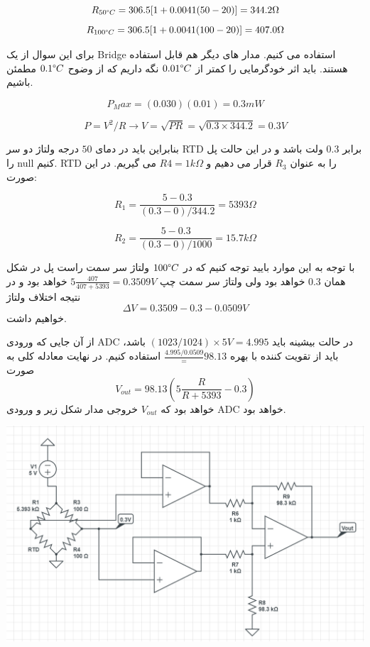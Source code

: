 \documentclass[12pt]{article}
\begin{document}
$$R_{50\degree C} = 306.5[1 + 0.0041(50-20)] = 344.2 \Omega$$
$$R_{100 \degree C} = 306.5 [1 + 0.0041 (100 -20)] = 407.0 \Omega$$


برای این سوال از یک Bridge استفاده می کنیم. مدار های دیگر هم قابل استفاده هستند. باید اثر خودگرمایی را کمتر از $0.01 \degree C$ نگه داریم که از وضوح $0.1\degree C$ مطمئن باشیم.

$$P_Max = (0.030)(0.01) = 0.3 mW$$

$$P = V^2 / R \rightarrow V= \sqrt{PR} = \sqrt{0.3 \times 344.2} = 0.3 V$$

بنابراین باید در دمای $50$ درجه ولتاژ دو سر RTD برابر $0.3$ ولت باشد و در این حالت پل را null کنیم. RTD را به عنوان $R_3$ قرار می دهیم و $R4=1k\Omega$ می گیریم. در این صورت:

$$R_1 = \frac{5-0.3}{(0.3-0)/344.2} = 5393 \Omega$$

$$R_2 = \frac{5-0.3}{(0.3-0)/1000} = 15.7 k\Omega$$

با توجه به این موارد بایید توجه کنیم که در $100\degree C$ ولتاژ سر سمت راست پل در شکل همان $0.3$ خواهد بود ولی ولتاژ سر سمت چپ 
$5 \frac{407}{407+5393} = 0.3509 V$
خواهد بود و در نتیجه اختلاف ولتاژ
$$\Delta V = 0.3509 - 0.3 - 0.0509 V$$
خواهیم داشت.

از آن جایی که ورودی ADC در حالت بیشینه باید
$(1023/1024) \times 5V = 4.995$
باشد، باید از تقویت کننده با بهره
$\frac{4.995 / 0.0509} = 98.13$ 
استفاده کنیم. در نهایت معادله کلی به صورت
$$V_{out} = 98.13 (5 \frac{R}{R+5393} - 0.3)$$
خواهد بود که $V_{out}$ خروجی مدار شکل زیر و ورودی ADC خواهد بود.






\begin{center}
	\includegraphics[width = 1.0 \textwidth]{images/8.png}
\end{center}
\end{document}
